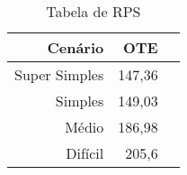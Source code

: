 \begin{table}[!htb]
    \centering
    \caption[Resultado RPS]{Tabela de RPS 
    \label{tab:result-rps}}
    \begin{tabular}{rrr}
        \toprule
            Cenário & OTE \\ 
        \midrule
            Super Simples & 147,36  \\
            Simples & 149,03  \\
            Médio & 186,98 \\
            Difícil & 205,6 \\
        \bottomrule
    \end{tabular}
\end{table}